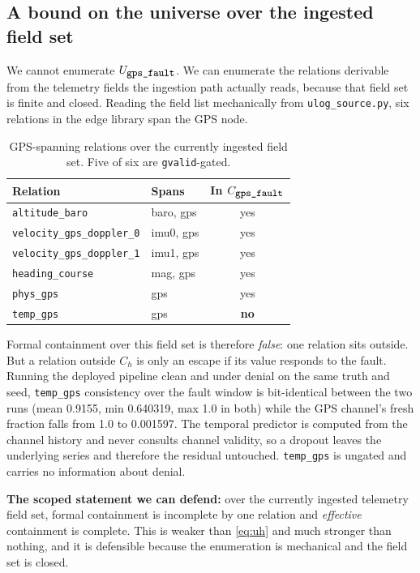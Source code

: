 \documentclass[11pt,a4paper]{article}
\newcommand{\code}[1]{\texttt{\small #1}}
\begin{document}
\subsection{A bound on the universe over the ingested field set}
\label{sec:fieldset}

We cannot enumerate $U_{\code{gps\_fault}}$. We can enumerate the relations
derivable from the telemetry fields the ingestion path actually reads, because
that field set is finite and closed. Reading the field list mechanically from
\code{ulog\_source.py}, six relations in the edge library span the GPS node.

\begin{table}[h]
\centering
\small
\begin{tabular}{llc}
\toprule
Relation & Spans & In $C_{\code{gps\_fault}}$ \\
\midrule
\code{altitude\_baro}           & baro, gps & yes \\
\code{velocity\_gps\_doppler\_0} & imu0, gps & yes \\
\code{velocity\_gps\_doppler\_1} & imu1, gps & yes \\
\code{heading\_course}          & mag, gps  & yes \\
\code{phys\_gps}                & gps       & yes \\
\code{temp\_gps}                & gps       & \textbf{no} \\
\bottomrule
\end{tabular}
\caption{GPS-spanning relations over the currently ingested field set. Five of
six are \code{gvalid}-gated.}
\label{tab:fieldset}
\end{table}

Formal containment over this field set is therefore \emph{false}: one relation
sits outside. But a relation outside $C_h$ is only an escape if its value
responds to the fault. Running the deployed pipeline clean and under denial on
the same truth and seed, \code{temp\_gps} consistency over the fault window is
bit-identical between the two runs (mean 0.9155, min 0.640319, max 1.0 in
both) while the GPS channel's fresh fraction falls from 1.0 to 0.001597. The
temporal predictor is computed from the channel history and never consults
channel validity, so a dropout leaves the underlying series and therefore the
residual untouched. \code{temp\_gps} is ungated and carries no information
about denial.

\textbf{The scoped statement we can defend:} over the currently ingested
telemetry field set, formal containment is incomplete by one relation and
\emph{effective} containment is complete. This is weaker than \eqref{eq:uh} and
much stronger than nothing, and it is defensible because the enumeration is
mechanical and the field set is closed.
\end{document}
